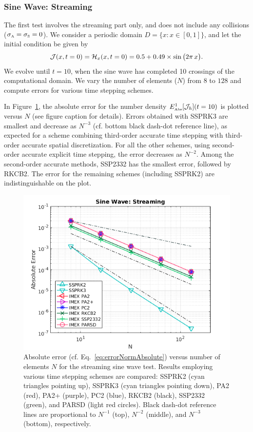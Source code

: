 \subsubsection{Sine Wave: Streaming}

The first test involves the streaming part only, and does not include any collisions ($\sigma_{\mbox{\tiny A}}=\sigma_{\mbox{\tiny S}}=0$).  
We consider a periodic domain $D=\{x:x\in[0,1]\}$, and let the initial condition be given by
\begin{equation}
  \mathcal{J}(x,t=0)=\mathcal{H}_{x}(x,t=0)=0.5+0.49\times\sin\big(2\pi\,x\big).  
  \label{eq:initialConditionStreaming}
\end{equation}
We evolve until $t=10$, when the sine wave has completed 10 crossings of the computational domain.  
We vary the number of elements ($N$) from $8$ to $128$ and compute errors for various time stepping schemes.  

In Figure~\ref{fig:SineWaveStreaming}, the absolute error for the number density $E_{\mbox{\tiny Abs}}^{1}[\mathcal{J}_{h}](t=10)$ is plotted versus $N$ (see figure caption for details).  
Errors obtained with SSPRK3 are smallest and decrease as $N^{-3}$ (cf. bottom black dash-dot reference line), as expected for a scheme combining third-order accurate time stepping with third-order accurate spatial discretization.  
For all the other schemes, using second-order accurate explicit time stepping, the error decreases as $N^{-2}$.  
Among the second-order accurate methods, SSP2332 has the smallest error, followed by RKCB2.  
The error for the remaining schemes (including SSPRK2) are indistinguishable on the plot.  
\begin{figure}[h]
  \centering
    \includegraphics[width=\textwidth]{figures/SineWaveStreaming}
   \caption{Absolute error (cf. Eq.~\eqref{eq:errorNormAbsolute}) versus number of elements $N$ for the streaming sine wave test.  Results employing various time stepping schemes are compared: SSPRK2 (cyan triangles pointing up), SSPRK3 (cyan triangles pointing down), PA2 (red), PA2+ (purple), PC2 (blue), RKCB2 (black), SSP2332 (green), and PARSD (light red circles).  Black dash-dot reference lines are proportional to $N^{-1}$ (top), $N^{-2}$ (middle), and $N^{-3}$ (bottom), respectively.}
  \label{fig:SineWaveStreaming}
\end{figure}


